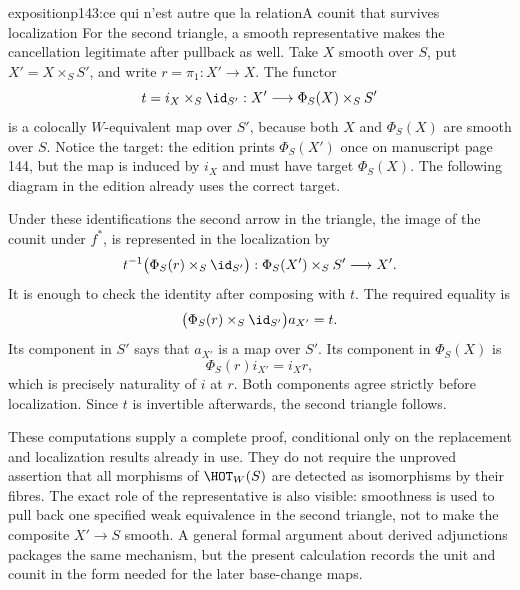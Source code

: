 \begin{dcomment}{exposition}{p143:ce qui n'est autre que la relation}{A counit that survives localization}
For the second triangle, a smooth representative makes the cancellation legitimate after pullback as well. Take $X$ smooth over $S$, put $X'=X\times_S S'$, and write $r=\pi_1:X'\to X$. The functor
\[
 t=i_X\times_S\id_{S'}:
 X'\longrightarrow\Phi_S(X)\times_S S'
\]
is a colocally $W$-equivalent map over $S'$, because both $X$ and $\Phi_S(X)$ are smooth over $S$. Notice the target: the edition prints $\Phi_S(X')$ once on manuscript page 144, but the map is induced by $i_X$ and must have target $\Phi_S(X)$. The following diagram in the edition already uses the correct target.

Under these identifications the second arrow in the triangle, the image of the counit under $f^*$, is represented in the localization by
\[
 t^{-1}\bigl(\Phi_S(r)\times_S\id_{S'}\bigr):
 \Phi_S(X')\times_S S'\longrightarrow X'.
\]
It is enough to check the identity after composing with $t$. The required equality is
\[
 \bigl(\Phi_S(r)\times_S\id_{S'}\bigr)a_{X'}=t.
\]
Its component in $S'$ says that $a_{X'}$ is a map over $S'$. Its component in $\Phi_S(X)$ is
\[
 \Phi_S(r)i_{X'}=i_Xr,
\]
which is precisely naturality of $i$ at $r$. Both components agree strictly before localization. Since $t$ is invertible afterwards, the second triangle follows.

These computations supply a complete proof, conditional only on the replacement and localization results already in use. They do not require the unproved assertion that all morphisms of $\HOT_W(S)$ are detected as isomorphisms by their fibres. The exact role of the representative is also visible: smoothness is used to pull back one specified weak equivalence in the second triangle, not to make the composite $X'\to S$ smooth. A general formal argument about derived adjunctions packages the same mechanism, but the present calculation records the unit and counit in the form needed for the later base-change maps.
\end{dcomment}

